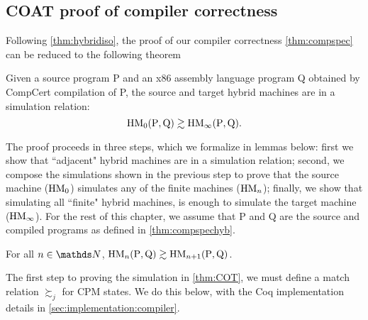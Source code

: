 \subsection{COAT proof of compiler correctness}\label{sec:coatproof}

Following \cref{thm:hybridiso}, the proof of our compiler correctness \cref{thm:compspec} can be reduced to the following theorem

\begin{theorem}\label{thm:compspechyb}
Given a source program P and an x86 assembly language program Q obtained by CompCert compilation of P, the source and target hybrid machines are in a simulation relation:
$$\text{HM}_{0}(\text{P},\text{Q}) \gtrsim \text{HM}_{\infty}(\text{P},\text{Q}).$$
\end{theorem}

The proof proceeds in three steps, which we formalize in lemmas below: first we show that ``adjacent" hybrid machines are in a simulation relation; second, we compose the simulations shown in the previous step to prove that the source machine ($\text{HM}_{0}$) simulates any of the finite machines ($\text{HM}_{n}$); finally, we show that simulating all ``finite" hybrid machines, is enough to simulate the target machine ($\text{HM}_{\infty}$). For the rest of this chapter, we assume that P and Q are the source and compiled programs as defined in \cref{thm:compspechyb}.

\begin{lemma}\label{thm:COT} For all  $n\in \nat$,  $\text{HM}_{n}(\text{P},\text{Q}) \gtrsim \text{HM}_{n+1}(\text{P},\text{Q})$. \end{lemma}

The first step to proving the simulation in \cref{thm:COT}, we must define a match relation $\succsim_j$ for CPM states. We do this below, with the Coq implementation details in \cref{sec:implementation:compiler}. 

